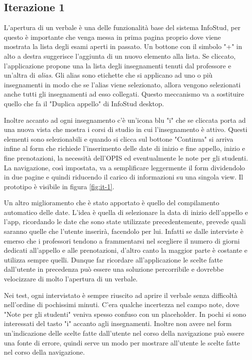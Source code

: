 \documentclass[Lau, oneside, noexaminfo]{sapthesis}%
\begin{document}
\subsection{Iterazione 1}
L'apertura di un verbale è una delle funzionalità base del sistema InfoStud, per questo è importante che venga messa in prima pagina proprio dove viene mostrata la lista degli esami aperti in passato. Un bottone con il simbolo "+" in alto a destra suggerisce l'aggiunta di un nuovo elemento alla lista. Se cliccato, l'applicazione propone una la lista degli insegnamenti tenuti dal professore e un'altra di \textit{alias}. Gli alias sono etichette che si applicano ad uno o più insegnamenti in modo che se l'alias viene selezionato, allora vengono selezionati anche tutti gli insegnamenti ad esso collegati. Questo meccanismo va a sostituire quello che fa il "Duplica appello" di InfoStud desktop.

Inoltre accanto ad ogni insegnamento c'è un'icona blu "i" che se cliccata porta ad una nuova vista che mostra i corsi di studio in cui l'insegnamento è attivo. Questi elementi sono selezionabili e quando si clicca sul bottone "Continua" si arriva infine al form che richiede l'inserimento delle date di inizio e fine appello, inizio e fine prenotazioni, la necessità dell'OPIS ed eventualmente le note per gli studenti. La navigazione, così impostata, va a semplificare leggermente il form dividendolo in due pagine e quindi riducendo il carico di informazioni su una singola view. Il prototipo è visibile in figura \ref{fig:it-1}.

Un altro miglioramento che è stato apportato è quello del compilamento automatico delle date. L'idea è quella di selezionare la data di inizio dell'appello e l'app, ricordando le date che sono state utilizzate precedentemente, prevede quali saranno quelle che l'utente inserirà, facendolo per lui. Infatti se dalle interviste è emerso che i professori tendono a frammentarsi nel scegliere il numero di giorni dedicati all'appello e alle prenotazioni, d'altro canto la maggior parte è costante e utilizza sempre quelli. Dunque far ricordare all'applicazione le scelte fatte dall'utente in precedenza può essere una soluzione percorribile e dovrebbe velocizzare di molto l'apertura di un verbale. %

Nei test, ogni intervistato è sempre riuscito ad aprire il verbale senza difficoltà nell'ordine di pochissimi minuti. C'era qualche incertezza nel campo note, dove "Note per gli studenti" veniva spesso confuso con un placeholder. In pochi si sono interessati del tasto "i" accanto agli insegnamenti. Inoltre non avere nel form un'indicazione delle scelte fatte dall'utente nel corso della navigazione può essere una fonte di errore, quindi serve un modo per mostrare all'utente le scelte fatte nel corso della navigazione.
\end{document}
